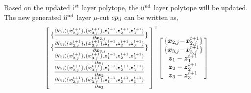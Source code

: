 \documentclass[letterpaper]{article} %
\begin{document}
Based on the updated ${\rm{\uppercase\expandafter{\romannumeral1}}}^{\rm{st}}$ layer polytope, the ${\rm{\uppercase\expandafter{\romannumeral2}}}^{\rm{nd}}$ layer polytope will be updated.  The new generated ${\rm{\uppercase\expandafter{\romannumeral2}}}^{\rm{nd}}$ layer $\mu$-cut ${cp_{\rm{\uppercase\expandafter{\romannumeral2}}}}$ can be written as,
\begin{equation}
\label{eq:new_outer_cp}
\begin{array}{l}
\! {\left[ \! \begin{array}{l}
\!\{\frac{{\partial h_{{\rm{\uppercase\expandafter{\romannumeral2}}}}(\{{\boldsymbol{x}_{2,j}^{t+1}}\} ,\{ {\boldsymbol{x}_{3,j}^{t+1}}\} ,{\boldsymbol{z}_1^{t+1}}{\rm{,}}{\boldsymbol{z}_2^{t+1}},{\boldsymbol{z}_3^{t+1}})}}{{\partial {\boldsymbol{x}_{2,j}}}} \}\!\\
\!\{\frac{{\partial h_{{\rm{\uppercase\expandafter{\romannumeral2}}}}(\{{\boldsymbol{x}_{2,j}^{t+1}}\} ,\{ {\boldsymbol{x}_{3,j}^{t+1}}\} ,{\boldsymbol{z}_1^{t+1}}{\rm{,}}{\boldsymbol{z}_2^{t+1}},{\boldsymbol{z}_3^{t+1}})}}{{\partial {\boldsymbol{x}_{3,j}}}} \}\!\\
\, \, \frac{{\partial h_{{\rm{\uppercase\expandafter{\romannumeral2}}}}(\{{\boldsymbol{x}_{2,j}^{t+1}}\} ,\{ {\boldsymbol{x}_{3,j}^{t+1}}\} ,{\boldsymbol{z}_1^{t+1}}{\rm{,}}{\boldsymbol{z}_2^{t+1}},{\boldsymbol{z}_3^{t+1}})}}{{\partial \boldsymbol{z}_1}} \\
\, \,  \frac{{\partial h_{{\rm{\uppercase\expandafter{\romannumeral2}}}}(\{{\boldsymbol{x}_{2,j}^{t+1}}\} ,\{ {\boldsymbol{x}_{3,j}^{t+1}}\} ,{\boldsymbol{z}_1^{t+1}}{\rm{,}}{\boldsymbol{z}_2^{t+1}},{\boldsymbol{z}_3^{t+1}})}}{{\partial \boldsymbol{z}_2}} \\
\, \,  \frac{{\partial h_{{\rm{\uppercase\expandafter{\romannumeral2}}}}(\{{\boldsymbol{x}_{2,j}^{t+1}}\} ,\{ {\boldsymbol{x}_{3,j}^{t+1}}\} ,{\boldsymbol{z}_1^{t+1}}{\rm{,}}{\boldsymbol{z}_2^{t+1}},{\boldsymbol{z}_3^{t+1}})}}{{\partial \boldsymbol{z}_3}}
\end{array} \! \right]^{\top}}\! \left[\! \begin{array}{l}
\! \{ \boldsymbol{x}_{2,j} \!-\! \boldsymbol{x}_{2,j}^{t+1} \}\!\\
\!\{ \boldsymbol{x}_{3,j} \!-\! \boldsymbol{x}_{3,j}^{t+1} \}\!\\
\; \,  \boldsymbol{z}_1 - \boldsymbol{z}_1^{t+1}  \\
\; \,  \boldsymbol{z}_2 - {\boldsymbol{z}_2^{t+1}} \\
\; \,  \boldsymbol{z}_3 - \boldsymbol{z}_3^{t+1}
\end{array} \! \right] \\


\end{array}
\end{equation}
\end{document}
